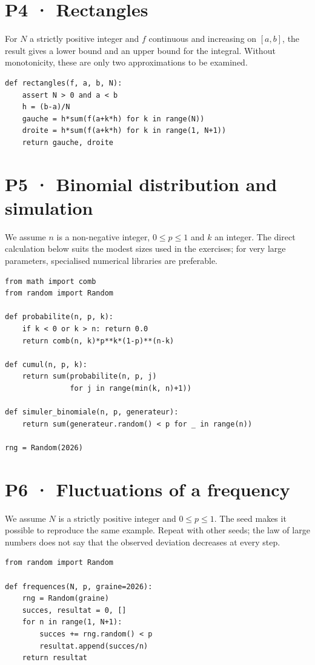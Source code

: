 \section{P4 · Rectangles}
For $N$ a strictly positive integer and $f$ continuous and increasing on $[a,b]$, the result gives a lower bound and an upper bound for the integral. Without monotonicity, these are only two approximations to be examined.
\begin{lstlisting}
def rectangles(f, a, b, N):
    assert N > 0 and a < b
    h = (b-a)/N
    gauche = h*sum(f(a+k*h) for k in range(N))
    droite = h*sum(f(a+k*h) for k in range(1, N+1))
    return gauche, droite
\end{lstlisting}
\clearpage\section{P5 · Binomial distribution and simulation}
We assume $n$ is a non-negative integer, $0\le p\le1$ and $k$ an integer. The direct calculation below suits the modest sizes used in the exercises; for very large parameters, specialised numerical libraries are preferable.
\begin{lstlisting}
from math import comb
from random import Random

def probabilite(n, p, k):
    if k < 0 or k > n: return 0.0
    return comb(n, k)*p**k*(1-p)**(n-k)

def cumul(n, p, k):
    return sum(probabilite(n, p, j)
               for j in range(min(k, n)+1))

def simuler_binomiale(n, p, generateur):
    return sum(generateur.random() < p for _ in range(n))

rng = Random(2026)
\end{lstlisting}
\section{P6 · Fluctuations of a frequency}
We assume $N$ is a strictly positive integer and $0\le p\le1$. The seed makes it possible to reproduce the same example. Repeat with other seeds; the law of large numbers does not say that the observed deviation decreases at every step.
\begin{lstlisting}
from random import Random

def frequences(N, p, graine=2026):
    rng = Random(graine)
    succes, resultat = 0, []
    for n in range(1, N+1):
        succes += rng.random() < p
        resultat.append(succes/n)
    return resultat
\end{lstlisting}
